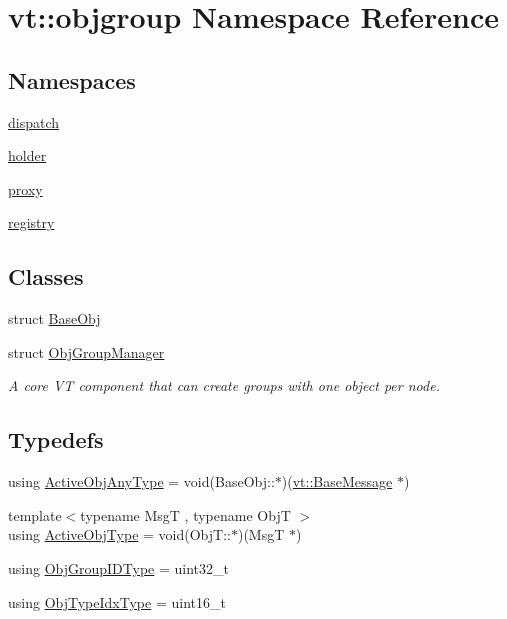 \hypertarget{namespacevt_1_1objgroup}{}\section{vt\+:\+:objgroup Namespace Reference}
\label{namespacevt_1_1objgroup}
\subsection*{Namespaces}
\begin{DoxyCompactItemize}
\item 
 \hyperlink{namespacevt_1_1objgroup_1_1dispatch}{dispatch}
\item 
 \hyperlink{namespacevt_1_1objgroup_1_1holder}{holder}
\item 
 \hyperlink{namespacevt_1_1objgroup_1_1proxy}{proxy}
\item 
 \hyperlink{namespacevt_1_1objgroup_1_1registry}{registry}
\end{DoxyCompactItemize}
\subsection*{Classes}
\begin{DoxyCompactItemize}
\item 
struct \hyperlink{structvt_1_1objgroup_1_1_base_obj}{Base\+Obj}
\item 
struct \hyperlink{structvt_1_1objgroup_1_1_obj_group_manager}{Obj\+Group\+Manager}
\begin{DoxyCompactList}\small\item\em A core VT component that can create groups with one object per node. \end{DoxyCompactList}\end{DoxyCompactItemize}
\subsection*{Typedefs}
\begin{DoxyCompactItemize}
\item 
using \hyperlink{namespacevt_1_1objgroup_a25bec5d3c8e8bb02b62280eec62b8ac7}{Active\+Obj\+Any\+Type} = void(Base\+Obj\+::$\ast$)(\hyperlink{namespacevt_ac34f95a5e2b8109b55bfba52b074443d}{vt\+::\+Base\+Message} $\ast$)
\item 
{\footnotesize template$<$typename MsgT , typename ObjT $>$ }\\using \hyperlink{namespacevt_1_1objgroup_a979bd9dc714fdacafc4b83f98271bc23}{Active\+Obj\+Type} = void(Obj\+T\+::$\ast$)(MsgT $\ast$)
\item 
using \hyperlink{namespacevt_1_1objgroup_a54a50ff6833bf618e5bedb9a3b6d0e07}{Obj\+Group\+I\+D\+Type} = uint32\+\_\+t
\item 
using \hyperlink{namespacevt_1_1objgroup_a378e4b966221779c74f3a2f921eb2421}{Obj\+Type\+Idx\+Type} = uint16\+\_\+t
\end{DoxyCompactItemize}
